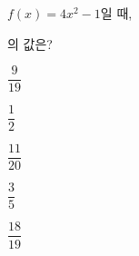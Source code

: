 \hspace*{2mm}\begin{minipage}[t]{\dimexpr\linewidth-2mm\relax}\vspace{0pt}
$f(x)=4x^2-1$일 때, \par\smallskip{}\par\smallskip\noindent 의 값은?
\begin{choices32}{\rule[-3ex]{0pt}{8ex}$\dfrac{9}{19}$}{\rule[-3ex]{0pt}{8ex}$\dfrac{1}{2}$}{\rule[-3ex]{0pt}{8ex}$\dfrac{11}{20}$}{\rule[-3ex]{0pt}{8ex}$\dfrac{3}{5}$}{\rule[-3ex]{0pt}{8ex}$\dfrac{18}{19}$}\end{choices32}\end{minipage}
